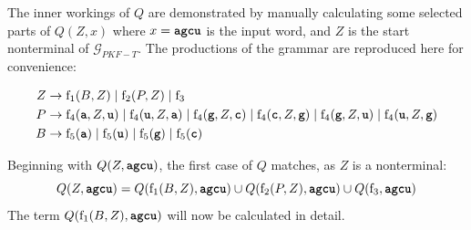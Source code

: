 \documentclass[
    a4paper,
    12pt,
    twoside,
    BCOR=12mm,
    parskip=half,
    chapterprefix,
    numbers=noenddot,
    bibliography=totoc
]{scrbook}
\begin{document}
\begin{example}
  The inner workings of $Q$ are demonstrated by manually calculating some selected parts of $Q(Z,x)$ where $x=\ts{agcu}$ is the input word, and $Z$ is the start nonterminal of $\mathcal{G}_{PKF-T}$. The productions of the grammar are reproduced here for convenience:
  
  \pagebreak
  
  \begingroup
  \setlength\abovedisplayskip{0pt}
  \begin{align*}
    Z &\to \op{f}_1(B,Z) \mid \op{f}_2(P,Z) \mid \op{f}_3\\
    P &\to \op{f}_4(\ts{a},Z,\ts{u}) \mid \op{f}_4(\ts{u},Z,\ts{a}) \mid \op{f}_4(\ts{g},Z,\ts{c}) \mid \op{f}_4(\ts{c},Z,\ts{g}) \mid \op{f}_4(\ts{g},Z,\ts{u}) \mid \op{f}_4(\ts{u},Z,\ts{g})\\
    B &\to \op{f}_5(\ts{a}) \mid \op{f}_5(\ts{u}) \mid \op{f}_5(\ts{g}) \mid \op{f}_5(\ts{c})
  \end{align*}
  \endgroup

  Beginning with $Q(Z,\ts{agcu})$, the first case of $Q$ matches, as $Z$ is a nonterminal:
  \[ Q(Z,\ts{agcu}) = Q(\op{f}_1(B,Z),\ts{agcu}) \cup Q(\op{f}_2(P,Z),\ts{agcu}) \cup Q(\op{f}_3,\ts{agcu}) \]
  The term $Q(\op{f}_1(B,Z),\ts{agcu})$ will now be calculated in detail.
  

\end{example}
\end{document}
